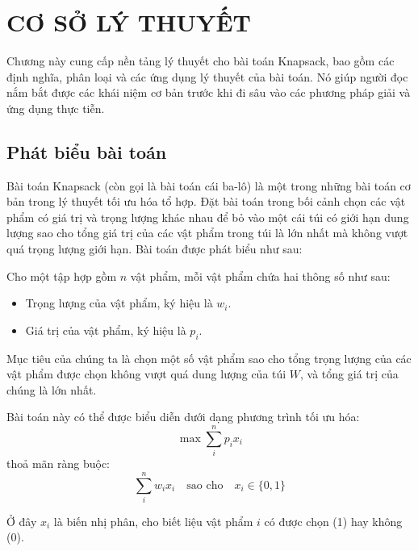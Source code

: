 \chapter{CƠ SỞ LÝ THUYẾT}
Chương này cung cấp nền tảng lý thuyết cho bài toán Knapsack, bao gồm các định nghĩa, phân loại và các ứng dụng lý thuyết của bài toán. Nó giúp người đọc nắm bắt được các khái niệm cơ bản trước khi đi sâu vào các phương pháp giải và ứng dụng thực tiễn.
\section{Phát biểu bài toán}
Bài toán Knapsack (còn gọi là bài toán cái ba-lô) là một trong những bài toán cơ bản trong lý thuyết tối ưu hóa tổ hợp. Đặt bài toán trong bối cảnh chọn các vật phẩm có giá trị và trọng lượng khác nhau để bỏ vào một cái túi có giới hạn dung lượng sao cho tổng giá trị của các vật phẩm trong túi là lớn nhất mà không vượt quá trọng lượng giới hạn. Bài toán được phát biểu  như sau:

Cho một tập hợp gồm $n$ vật phẩm, mỗi vật phẩm chứa hai thông số như sau:
\begin{itemize}
    \item Trọng lượng của vật phẩm, ký hiệu là $w_i$.
    \item Giá trị của vật phẩm, ký hiệu là $p_i$.
\end{itemize}
Mục tiêu của chúng ta là chọn một số vật phẩm sao cho tổng trọng lượng của các vật phẩm được chọn không vượt quá dung lượng của túi $W$, và tổng giá trị của chúng là lớn nhất.

Bài toán này có thể được biểu diễn dưới dạng phương trình tối ưu hóa:
\[
    \max \sum^n_i p_ix_i
\]
thoả mãn ràng buộc:
\[
    \sum^n_i w_ix_i \quad \text{sao cho} \quad x_i \in \{0,1\}
\]

Ở đây $x_i$ là biến nhị phân, cho biết liệu vật phẩm $i$
có được chọn (1) hay không (0).
